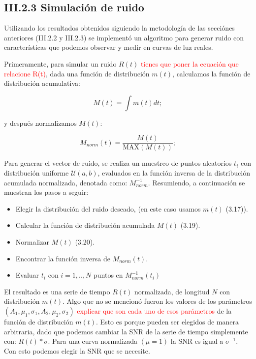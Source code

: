 \subsection*{III.2.3 Simulación de ruido}

Utilizando los resultados obtenidos siguiendo la metodología de las secciónes anteriores (III.2.2 y III.2.3) se implementó un algoritmo para generar ruido con características que podemos observar y medir en curvas de luz reales.

Primeramente, para simular un ruido $R(t)$ \textcolor{red}{tienes que poner la ecuación que relacione R(t)}, dada una función de distribución $m(t)$, calculamos la función de distribución acumulativa:

\begin{equation}
  \displaystyle M(t)= \int m(t)dt;
\end{equation}

\noindent y después normalizamos $M(t)$:

\begin{equation}
  \displaystyle M_{norm}(t)= \dfrac{M(t)}{\mbox{MAX}(M(t))};
\end{equation}

Para generar el vector de ruido, se realiza un muestreo de puntos aleatorios $t_{i}$ con distribución uniforme $\mathcal{U}(a,b)$, evaluados en la función inversa de la distribución acumulada normalizada, denotada como: $M^{-1}_{norm}$. Resumiendo, a continuación se muestran  los pasos a seguir:

\begin{itemize}
  \item Elegir la distribución del ruido deseado, (en este caso usamos $m(t)$ (3.17)).
  \item Calcular la función de distribución acumulada $M(t)$ (3.19).
  \item Normalizar $M(t)$ (3.20).
  \item Encontrar la función inversa de $M_{norm}(t)$.
  \item Evaluar $t_{i}$ con $i=1,..,N$ puntos en $M^{-1}_{norm}(t_{i})$
\end{itemize}

El resultado es una serie de tiempo $R(t)$ normalizada, de longitud $N$ con distribución $m(t)$. Algo que no se mencionó fueron los valores de los parámetros $(A_{1},\mu_{1},\sigma_{1},A_{2},\mu_{2},\sigma_{2})$ \textcolor{red}{explicar que son cada uno de esos parámetros} de la función de distribución $m(t)$. Esto es porque pueden ser elegidos de manera arbitraria, dado que podemos cambiar la SNR de la serie de tiempo simplemente con: $R(t)*\sigma$. Para una curva normalizada $(\mu=1)$ la SNR es igual a $\sigma^{-1}$. Con esto podemos elegir la SNR que se necesite.

